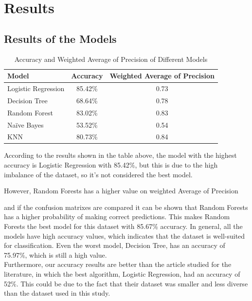 

\chapter{Results}

\section{Results of the Models}

\begin{table}[htbp]
    \centering
    \begin{tabular}{|l|c|c|}
    \hline
    \textbf{Model}           & \textbf{Accuracy} & \textbf{Weighted Average of Precision} \\ \hline
    Logistic Regression & 85.42\%          & 0.73                \\ \hline
    Decision Tree       & 68.64\%          & 0.78              \\ \hline
    Random Forest      & 83.02\%          & 0.83             \\ \hline
    Naïve Bayes         & 53.52\%          & 0.54               \\ \hline
    KNN                 & 80.73\%          & 0.84               \\ \hline
    \end{tabular}
    \caption{Accuracy and Weighted Average of Precision of Different Models}
    \end{table}
    
According to the results shown in the table above, the model with the highest accuracy is Logistic Regression with 85.42\%, but this is due to the high imbalance of the dataset, so it's not considered the best model.


However, Random Forests has a
higher value on weighted Average of Precision

and if the confusion matrixes are compared it can be shown that Random Forests has a higher 
probability of making correct predictions. This makes Random Forests the best model for this dataset with 85.67\% accuracy. 
In general, all the models have high accuracy values, which indicates that the dataset is well-suited for classification. Even the worst model, Decision Tree, has an accuracy of 75.97\%, which is still a high value.\\
Furthermore, our accuracy results are better than the article studied for the literature, in which the best algorithm, Logistic Regression, had an accuracy of 52\%. This could be due to the fact that their dataset was smaller and less diverse than the dataset used in this study.
\\

